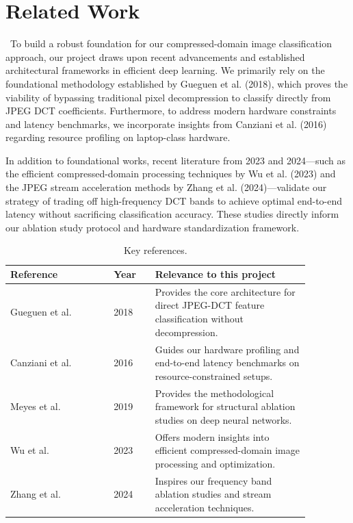 \documentclass[11pt]{article}
\begin{document}
\section{Related Work}
\label{sec:related}
\ To build a robust foundation for our compressed-domain image classification approach, our project draws upon recent advancements and established architectural frameworks in efficient deep learning. We primarily rely on the foundational methodology established by Gueguen et al. (2018), which proves the viability of bypassing traditional pixel decompression to classify directly from JPEG DCT coefficients. Furthermore, to address modern hardware constraints and latency benchmarks, we incorporate insights from Canziani et al. (2016) regarding resource profiling on laptop-class hardware.

In addition to foundational works, recent literature from 2023 and 2024—such as the efficient compressed-domain processing techniques by Wu et al. (2023) and the JPEG stream acceleration methods by Zhang et al. (2024)—validate our strategy of trading off high-frequency DCT bands to achieve optimal end-to-end latency without sacrificing classification accuracy. These studies directly inform our ablation study protocol and hardware standardization framework.

\begin{table}[H]
\centering
\caption{Key references.}
\label{tab:refs}
\begin{tabular}{@{}p{0.30\linewidth}p{0.12\linewidth}p{0.45\linewidth}@{}}
\toprule
\textbf{Reference} & \textbf{Year} & \textbf{Relevance to this project} \\
\midrule
Gueguen et al. \citep{gueguen2018faster} & 2018 & Provides the core architecture for direct JPEG-DCT feature classification without decompression. \\ \hline
Canziani et al. \citep{canziani2016analysis} & 2016 & Guides our hardware profiling and end-to-end latency benchmarks on resource-constrained setups. \\ \hline
Meyes et al. \citep{meyes2019ablation} & 2019 & Provides the methodological framework for structural ablation studies on deep neural networks. \\ \hline
Wu et al. \citep{wu2023efficient} & 2023 & Offers modern insights into efficient compressed-domain image processing and optimization. \\ \hline
Zhang et al. \citep{zhang2024accelerating} & 2024 & Inspires our frequency band ablation studies and stream acceleration techniques. \\ \hline
\bottomrule
\end{tabular}
\end{table}
\end{document}

